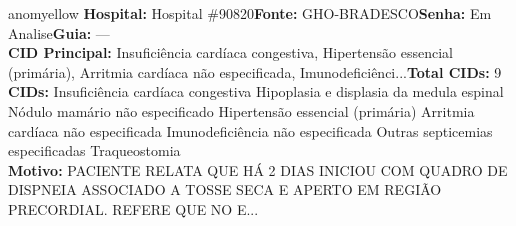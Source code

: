 \documentclass[a4paper,10pt]{article}
\begin{document}
\begin{anomalycard}[Interna\c{c}\~{a}o \#119657 | Pac. \#99233 | MODERADO (z=2.47) | LOS: 8d | 03/03/2026\,$\to$\,11/03/2026]{anomyellow}
\textbf{Hospital:} Hospital \#90820\quad \textbf{Fonte:} GHO-BRADESCO\quad \textbf{Senha:} Em Analise\quad \textbf{Guia:} ---\\

\textbf{CID Principal:} {\small Insuficiência cardíaca congestiva, Hipertensão essencial (primária), Arritmia cardíaca não especificada, Imunodeficiênci...}\quad\textbf{Total CIDs:} 9\\

\textbf{CIDs:} {\scriptsize Insuficiência cardíaca congestiva \textbar{} Hipoplasia e displasia da medula espinal \textbar{} Nódulo mamário não especificado \textbar{} Hipertensão essencial (primária) \textbar{} Arritmia cardíaca não especificada \textbar{} Imunodeficiência não especificada \textbar{} Outras septicemias especificadas \textbar{} Traqueostomia}\\

\textbf{Motivo:} {\scriptsize PACIENTE RELATA QUE HÁ 2 DIAS INICIOU COM QUADRO DE DISPNEIA ASSOCIADO A TOSSE SECA E APERTO EM REGIÃO PRECORDIAL. REFERE QUE NO E...}\\




\end{anomalycard}
\end{document}
